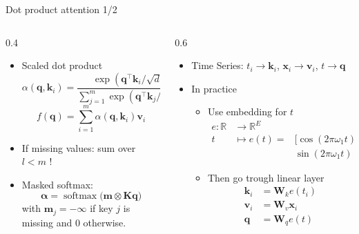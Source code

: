 \documentclass[pressentation,10pt,aspectratio=169,xcolor=table, colorlinks=true]{beamer}
\DeclareMathOperator{\softmax}{softmax}
\begin{document}
\begin{frame}{Dot product attention 1/2}
 
  \begin{columns}
    \begin{column}[t]{0.4\linewidth}
      \begin{itemize}
      \item Scaled dot product
        \[\alpha(\mathbf{q}, \mathbf{k}_i) = \dfrac{\exp(\mathbf{q}^\top \mathbf{k}_i / \sqrt{d})}{\sum_{j=1}^m \exp(\mathbf{q}^\top \mathbf{k}_j / \sqrt{d})}\]
        \[f(\mathbf{q}) = \sum_{i=1}^m \alpha(\mathbf{q}, \mathbf{k}_i)\mathbf{v}_i\]
      \item If missing values: sum over \(l<m\) !
      \item Masked softmax:
        \[\boldsymbol{\alpha} = \softmax\big(\mathbf{m}\otimes\mathbf{K}\mathbf{q}\big)\]
        with \(\mathbf{m}_j=-\infty\) if key \(j\) is missing and \(0\) otherwise.       
      \end{itemize}
    \end{column}

    \begin{column}[t]{0.6\linewidth}
      \begin{itemize}
      \item Time Series: \(t_i \rightarrow \mathbf{k}_i\), \(\mathbf{x}_i \rightarrow \mathbf{v}_i\), \(t \rightarrow \mathbf{q}\)
      \item In practice
        \begin{itemize}
        \item Use embedding for \(t\)
          \begin{align*}
            e:\mathbb{R}& \to \mathbb{R}^{E} \\ 
            t  & \mapsto  e(t) = &[\cos(2\pi \omega_1t),\ldots,\cos(2\pi \omega_Et),\\
                       & & \sin(2\pi \omega_1t),\ldots,\sin(2\pi \omega_Et)]
          \end{align*}
          \item Then go trough linear layer
            \begin{align*}
              \mathbf{k}_i &= \mathbf{W}_ke(t_i)\\
              \mathbf{v}_i &= \mathbf{W}_v\mathbf{x}_i\\
              \mathbf{q} &= \mathbf{W}_qe(t)\\
            \end{align*}
        \end{itemize}
      \end{itemize}
      

\end{column}
\end{columns}
\end{frame}
\end{document}
